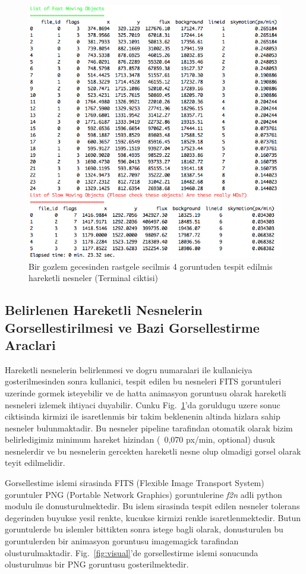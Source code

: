 \documentclass[review]{elsarticle}
\begin{document}
\begin{figure}[!t]
  \centering
  \includegraphics[scale=0.50]{terminal_output}
  \caption{Bir gozlem gecesinden rastgele secilmis 4 goruntuden tespit edilmis hareketli nesneler (Terminal ciktisi)}
  \label{fig:terminal_output}
\end{figure}

\subsection{Belirlenen Hareketli Nesnelerin Gorsellestirilmesi ve Bazi Gorsellestirme Araclari}

Hareketli nesnelerin belirlenmesi ve dogru numaralari ile kullaniciya gosterilmesinden sonra kullanici, tespit edilen bu nesneleri FITS goruntuleri uzerinde gormek isteyebilir ve de hatta animasyon goruntusu olarak hareketli nesneleri izlemek ihtiyaci duyabilir. Cunku Fig.~\ref{fig:terminal_output}'da goruldugu uzere sonuc ciktisinda kirmizi ile isaretlenmis bir takim beklenenin altinda hizlara sahip nesneler bulunmaktadir. Bu nesneler pipeline tarafindan otomatik olarak bizim belirledigimiz minimum hareket hizindan (~0,070 px/min, optional) dusuk nesnelerdir ve bu nesnelerin gercekten hareketli nesne olup olmadigi gorsel olarak teyit edilmelidir.  

Gorsellestime islemi sirasinda FITS (Flexible Image Transport System) goruntuler PNG (Portable Network Graphics) goruntulerine \textit{f2n} adli python modulu ile donusturulmektedir. Bu islem sirasinda tespit edilen nesneler tolerans degerinden buyukse yesil renkte, kucukse kirmizi renkle isaretlenmektedir. Butun goruntulerde bu islemler bittikten sonra istege bagli olarak, donusturulen bu goruntulerden bir animasyon goruntusu imagemagick tarafindan olusturulmaktadir. Fig.~\ref{fig:visual}'de gorsellestirme islemi sonucunda olusturulmus bir PNG goruntusu gosterilmektedir.
\end{document}
